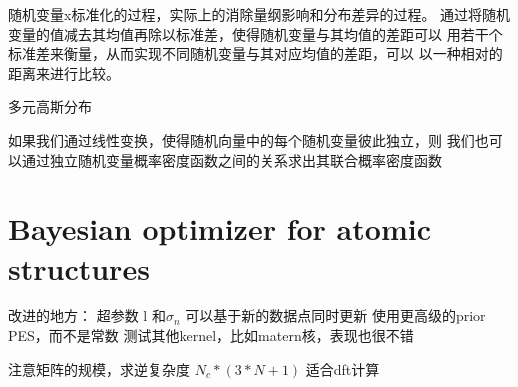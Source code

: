 \documentclass[a4paper, 12pt, CJKnumber, UTF8, openany,nofonts, fancyhdr]{ctexbook}
\begin{document}
 随机变量x标准化的过程，实际上的消除量纲影响和分布差异的过程。
 通过将随机变量的值减去其均值再除以标准差，使得随机变量与其均值的差距可以
 用若干个标准差来衡量，从而实现不同随机变量与其对应均值的差距，可以
 以一种相对的距离来进行比较。

 多元高斯分布

 如果我们通过线性变换，使得随机向量中的每个随机变量彼此独立，则
 我们也可以通过独立随机变量概率密度函数之间的关系求出其联合概率密度函数

 \section{Bayesian optimizer for atomic structures}

 改进的地方：
 超参数 l 和$\sigma_n$ 可以基于新的数据点同时更新
 使用更高级的prior PES，而不是常数
 测试其他kernel，比如matern核，表现也很不错

 注意矩阵的规模，求逆复杂度 $N_c*(3*N+1)$  适合dft计算
\end{document}
